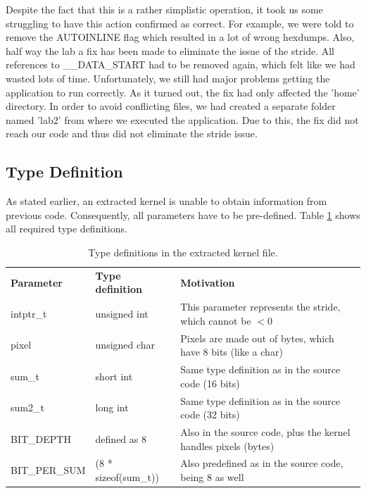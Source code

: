 Despite the fact that this is a rather simplistic operation, it took us some struggling to have this action confirmed as correct. For example, we were told to remove the AUTOINLINE flag which resulted in a lot of wrong hexdumps. Also, half way the lab a fix has been made to eliminate the issue of the stride. All references to \_\_DATA\_START had to be removed again, which felt like we had wasted lots of time. Unfortunately, we still had major problems getting the application to run correctly. As it turned out, the fix had only affected the 'home' directory. In order to avoid conflicting files, we had created a separate folder named 'lab2' from where we executed the application. Due to this, the fix did not reach our code and thus did not eliminate the stride issue.

\subsection{Type Definition}

As stated earlier, an extracted kernel is unable to obtain information from previous code. Consequently, all parameters have to be pre-defined. Table \ref{typedef} shows all required type definitions.

\begin{table}[htb]%
\begin{tabular}{lll}
	\bf{Parameter} 	& \bf{Type definition} 	& \bf{Motivation}\\ \cline{1-3}
	intptr\_t				&	unsigned int					& This parameter represents the stride, which cannot be $<$0\\
	pixel						& unsigned char					&	Pixels are made out of bytes, which have 8 bits (like a char)\\
	sum\_t					&	short int							& Same type definition as in the source code (16 bits)\\
	sum2\_t					& long int							& Same type definition as in the source code (32 bits)\\
	BIT\_DEPTH			& defined as 8					& Also in the source code, plus the kernel handles pixels (bytes)\\
	BIT\_PER\_SUM		&	(8 * sizeof(sum\_t))	& Also predefined as in the source code, being 8 as well\\
\end{tabular}
\caption{Type definitions in the extracted kernel file.}
\label{typedef}
\end{table}

